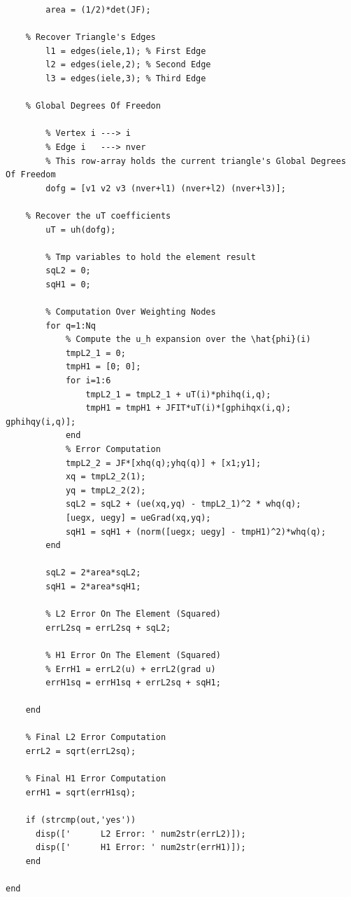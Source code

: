 \documentclass[12pt,a4paper]{report}
\theoremstyle{theorem}
\theoremstyle{theorem}
\theoremstyle{definition}
\begin{document}
\begin{lstlisting}[caption=Errore $L^2$ e $\mathbb{H}^1$, style=matlab]
        % Single Element Area (Triangle's Area)
        area = (1/2)*det(JF);
    
    % Recover Triangle's Edges
        l1 = edges(iele,1); % First Edge
        l2 = edges(iele,2); % Second Edge
        l3 = edges(iele,3); % Third Edge

    % Global Degrees Of Freedon

        % Vertex i ---> i
        % Edge i   ---> nver
        % This row-array holds the current triangle's Global Degrees Of Freedom
        dofg = [v1 v2 v3 (nver+l1) (nver+l2) (nver+l3)];
    
    % Recover the uT coefficients
        uT = uh(dofg);
        
        % Tmp variables to hold the element result
        sqL2 = 0;
        sqH1 = 0;
        
        % Computation Over Weighting Nodes
        for q=1:Nq
            % Compute the u_h expansion over the \hat{phi}(i)
            tmpL2_1 = 0; 
            tmpH1 = [0; 0];       
            for i=1:6
                tmpL2_1 = tmpL2_1 + uT(i)*phihq(i,q);
                tmpH1 = tmpH1 + JFIT*uT(i)*[gphihqx(i,q); gphihqy(i,q)];
            end
            % Error Computation
            tmpL2_2 = JF*[xhq(q);yhq(q)] + [x1;y1];
            xq = tmpL2_2(1);
            yq = tmpL2_2(2);            
            sqL2 = sqL2 + (ue(xq,yq) - tmpL2_1)^2 * whq(q);
            [uegx, uegy] = ueGrad(xq,yq); 
            sqH1 = sqH1 + (norm([uegx; uegy] - tmpH1)^2)*whq(q);
        end
    
        sqL2 = 2*area*sqL2;
        sqH1 = 2*area*sqH1;
        
        % L2 Error On The Element (Squared)
        errL2sq = errL2sq + sqL2;
        
        % H1 Error On The Element (Squared)
        % ErrH1 = errL2(u) + errL2(grad u)
        errH1sq = errH1sq + errL2sq + sqH1;
        
    end  
    
    % Final L2 Error Computation
    errL2 = sqrt(errL2sq);
    
    % Final H1 Error Computation
    errH1 = sqrt(errH1sq);
    
    if (strcmp(out,'yes'))
      disp(['      L2 Error: ' num2str(errL2)]);
      disp(['      H1 Error: ' num2str(errH1)]);
    end
    
end
\end{lstlisting}
\end{document}
